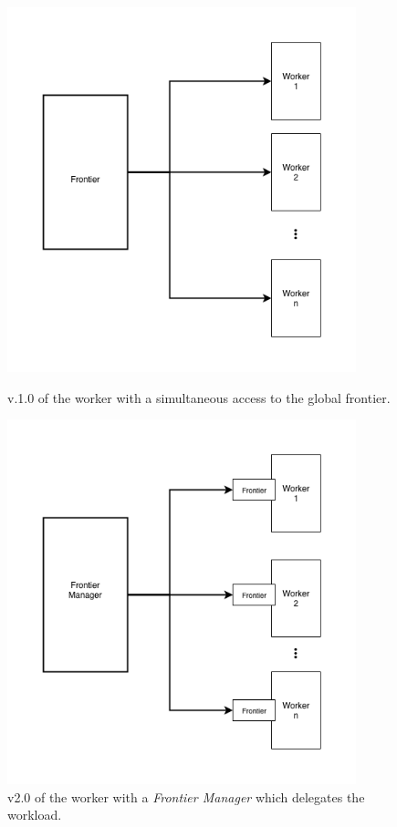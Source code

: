 \documentclass{article}
\begin{document}
\begin{figure}
	\begin{minipage}{0.45\textwidth}
		\centering
		\includegraphics[width=0.9\textwidth]{jittered-delay.png}
		\caption{v.1.0 of the worker with a simultaneous access to the global frontier.}
		\label{fig:1}
	\end{minipage}\hfill
	\begin{minipage}{0.45\textwidth}
		\centering
		\includegraphics[width=0.9\textwidth]{frontier-manager.png}
		\caption{v2.0 of the worker with a \textit{Frontier Manager} which delegates the workload.}
		\label{fig:2}
\end{minipage}
\end{figure}
\end{document}
